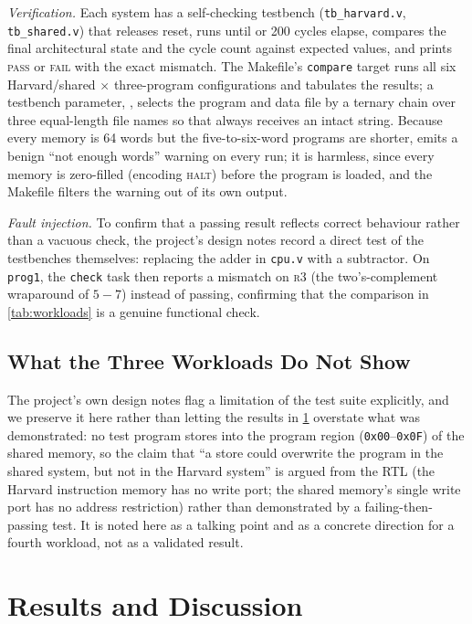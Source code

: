 \documentclass[conference]{IEEEtran}
\newcommand{\sig}[1]{\texttt{\detokenize{#1}}}
\begin{document}
\textit{Verification.} Each system has a self-checking testbench (\texttt{tb\_harvard.v},
\texttt{tb\_shared.v}) that releases reset, runs until \sig{halted} or 200 cycles elapse, compares
the final architectural state and the cycle count against expected values, and prints
\textsc{pass} or \textsc{fail} with the exact mismatch. The Makefile's \texttt{compare} target runs
all six Harvard/shared $\times$ three-program configurations and tabulates the results; a
testbench parameter, \sig{PROG_NUM}, selects the program and data file by a ternary chain over
three equal-length file names so that \sig{\$readmemh} always receives an intact string. Because
every memory is 64 words but the five-to-six-word programs are shorter,
\sig{\$readmemh} emits a benign ``not enough words'' warning on every run; it is harmless, since
every memory is zero-filled (encoding \textsc{halt}) before the program is loaded, and the
Makefile filters the warning out of its own output.

\textit{Fault injection.} To confirm that a passing result reflects correct behaviour rather than a
vacuous check, the project's design notes record a direct test of the testbenches themselves:
replacing the adder in \texttt{cpu.v} with a subtractor. On \texttt{prog1}, the \texttt{check} task
then reports a mismatch on \textsc{r3} (the two's-complement wraparound of $5-7$) instead of
passing, confirming that the comparison in \cref{tab:workloads} is a genuine functional check.

\subsection{What the Three Workloads Do Not Show}
The project's own design notes flag a limitation of the test suite explicitly, and we preserve it
here rather than letting the results in \cref{sec:results} overstate what was demonstrated: no test
program stores into the program region (\texttt{0x00}--\texttt{0x0F}) of the shared memory, so the
claim that ``a store could overwrite the program in the shared system, but not in the Harvard
system'' is argued from the RTL (the Harvard instruction memory has no write port; the shared
memory's single write port has no address restriction) rather than demonstrated by a failing-then-
passing test. It is noted here as a talking point and as a concrete direction for a fourth workload,
not as a validated result.

\section{Results and Discussion}
\label{sec:results}
\end{document}
